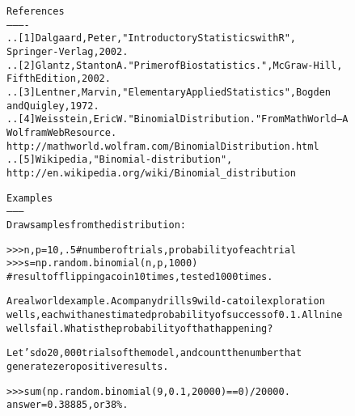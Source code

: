 \begin{boxedminipage}{\funcwidth}
\begin{alltt}
References
----------
.. [1] Dalgaard, Peter, "Introductory Statistics with R",
       Springer-Verlag, 2002.
.. [2] Glantz, Stanton A. "Primer of Biostatistics.", McGraw-Hill,
       Fifth Edition, 2002.
.. [3] Lentner, Marvin, "Elementary Applied Statistics", Bogden
       and Quigley, 1972.
.. [4] Weisstein, Eric W. "Binomial Distribution." From MathWorld--A
       Wolfram Web Resource.
       http://mathworld.wolfram.com/BinomialDistribution.html
.. [5] Wikipedia, "Binomial-distribution",
       http://en.wikipedia.org/wiki/Binomial\_distribution

Examples
--------
Draw samples from the distribution:

{\textgreater}{\textgreater}{\textgreater} n, p = 10, .5 \# number of trials, probability of each trial
{\textgreater}{\textgreater}{\textgreater} s = np.random.binomial(n, p, 1000)
\# result of flipping a coin 10 times, tested 1000 times.

A real world example. A company drills 9 wild-cat oil exploration
wells, each with an estimated probability of success of 0.1. All nine
wells fail. What is the probability of that happening?

Let's do 20,000 trials of the model, and count the number that
generate zero positive results.

{\textgreater}{\textgreater}{\textgreater} sum(np.random.binomial(9,0.1,20000)==0)/20000.
answer = 0.38885, or 38\%.
\end{alltt}

\setlength{\parskip}{1ex}
    \end{boxedminipage}

    \label{QSTK:qstklearn:mldiagnostics:chisquare}

    \vspace{0.5ex}

